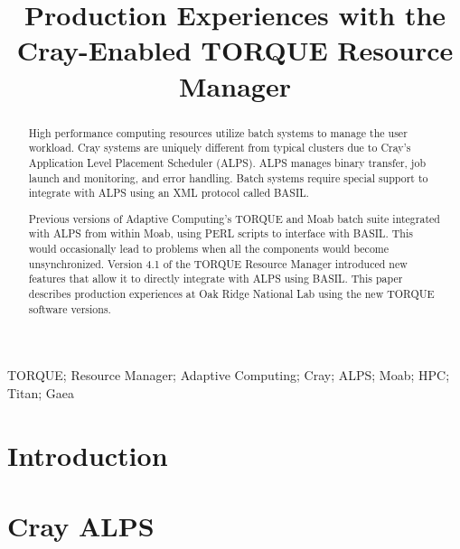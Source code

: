 \documentclass[10pt, conference, compsocconf]{IEEEtran}
\begin{document}
\title{Production Experiences with the Cray-Enabled TORQUE Resource Manager}

\author{
\and
{}
}

\maketitle


\begin{abstract}
High performance computing resources utilize batch systems to manage the user
workload. Cray systems are uniquely different from typical clusters due to
Cray’s Application Level Placement Scheduler (ALPS). ALPS manages binary
transfer, job launch and monitoring, and error handling. Batch systems require
special support to integrate with ALPS using an XML protocol called BASIL.

Previous versions of Adaptive Computing’s TORQUE and Moab batch suite integrated
with ALPS from within Moab, using PERL scripts to interface with BASIL. This
would occasionally lead to problems when all the components would become
unsynchronized. Version 4.1 of the TORQUE Resource Manager introduced new
features that allow it to directly integrate with ALPS using BASIL. This paper
describes production experiences at Oak Ridge National Lab using the new TORQUE
software versions.
\end{abstract}

\begin{IEEEkeywords}
TORQUE; Resource Manager; Adaptive Computing; Cray; ALPS; Moab; HPC; Titan; Gaea
\end{IEEEkeywords}


\section{Introduction}

\section{Cray ALPS}
\end{document}

